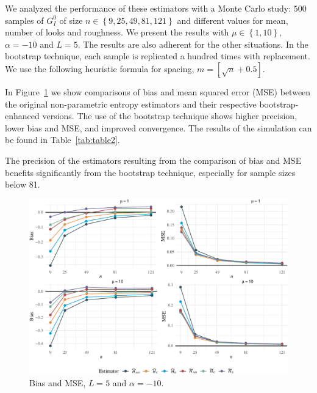 \documentclass[remotesensing,article,submit,moreauthors,pdftex]{Definitions/mdpi}
\begin{document}
We analyzed the performance of these estimators with a Monte Carlo study: \(500\) samples of \(G_I^0\) of size
\(n\in\left\{9, 25, 49, 81, 121\right\}\) and different values for mean, number of looks and roughness. We present the results with
\(\mu\in\left\{1, 10\right\}\), \(\alpha=-10\) and \(L=5\). The results are also adherent for the other situations. In the bootstrap technique, each sample is replicated a hundred times with replacement. We use the following heuristic formula for spacing,
\(m=\left[\sqrt{n}+0.5\right]\).

In Figure~\ref{fig:Plot_bias_mse_gi0} we show comparisons of bias and mean squared error (MSE) between the original non-parametric entropy estimators and their respective bootstrap-enhanced versions. The use of the bootstrap technique shows higher precision, lower bias and MSE, and improved convergence. The results of the simulation can be found in
Table~\ref{tab:table2}.

The precision of the estimators resulting from the comparison of bias and MSE benefits significantly from the bootstrap technique, especially for sample sizes below 81.

\begin{figure}[hbt]
\includegraphics[width=0.8\linewidth]{Identifying-Heterogeneity-in-SAR-Data-with-New-Test-Statistics_files/figure-latex/Plot_bias_mse_gi0-1} \caption{Bias and MSE, $L=5$ and  $\alpha=-10$.}\label{fig:Plot_bias_mse_gi0}
\end{figure}
\end{document}
